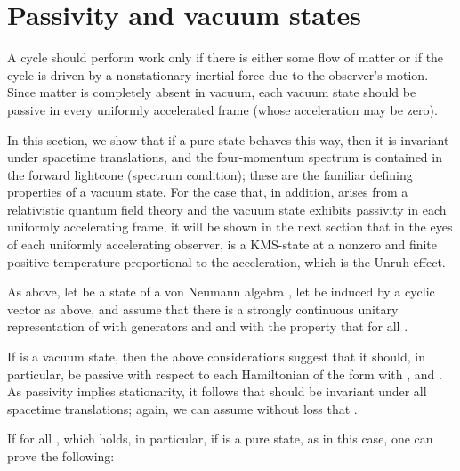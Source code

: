 \documentclass[a4paper,11pt]{article}
\def\dt{\cal}
\def\dB{{\dt B}}
\def\dM{{\dt M}}
\def\H{{\cal H}}
\def\gO{\Omega}
\def\go{\omega}
\def\Rd{\reals^{1+s}}
\def\reals{{\bf R}}
\begin{document}
\section{Passivity and vacuum states}\label{vacuum}

A cycle should perform work only if there is either some flow of matter
or if the cycle is driven by a nonstationary inertial force due to the
observer's motion.
Since matter is completely absent in vacuum, each
vacuum state should be passive in every uniformly
accelerated frame (whose acceleration may be zero).

In this section, we show that if a pure state \myHighlight{$\go$}\coordHE{} behaves this way,
then it is invariant under spacetime translations, and the
four-momentum spectrum is contained in the forward lightcone
(spectrum condition); these are the familiar defining
properties of a vacuum state.
For the case that, in addition, \myHighlight{$\dM$}\coordHE{} arises from a
relativistic quantum field theory and the vacuum state exhibits passivity
in each uniformly accelerating frame, it will be shown in the next section
that in the eyes of each uniformly accelerating observer,
\myHighlight{$\go$}\coordHE{} is a KMS-state at
a nonzero and finite positive temperature proportional to the
acceleration, which is the Unruh effect.

As above, let \myHighlight{$\go$}\coordHE{} be a state of a von Neumann algebra \myHighlight{$\dM$}\coordHE{}, let
\myHighlight{$\go$}\coordHE{} be induced by a cyclic vector \myHighlight{$\gO$}\coordHE{} as above, and assume
that there is a strongly continuous
unitary representation \coordHE{} of \myHighlight{$(\Rd,+)$}\coordHE{} with generators \coordHE{} and
\coordHE{} and with the property that
\myHighlight{$V(x)\dM V(x)^*=\dM$}\coordHE{} for all \myHighlight{$x\in\Rd$}\coordHE{}.

If \myHighlight{$\go$}\coordHE{} is a vacuum state, then the above considerations
suggest that it should, in particular, be passive with respect to
each Hamiltonian of the form
\coordHE{} with
\coordHE{}, and
\coordHE{}.
As passivity implies stationarity, it follows that
\myHighlight{$\go$}\coordHE{} should be invariant under all spacetime translations;
again, we can assume without loss that \myHighlight{$H\gO=P_1\gO=\dots=P_s\gO=0$}\coordHE{}.

If \myHighlight{$V(x)\in\dM$}\coordHE{} for all \myHighlight{$x\in\Rd$}\coordHE{}, which holds, in particular, if \myHighlight{$\go$}\coordHE{}
is a pure state, as \myHighlight{$\dM=\dB(\H)$}\coordHE{} in this case, one
can prove the following:
\end{document}
